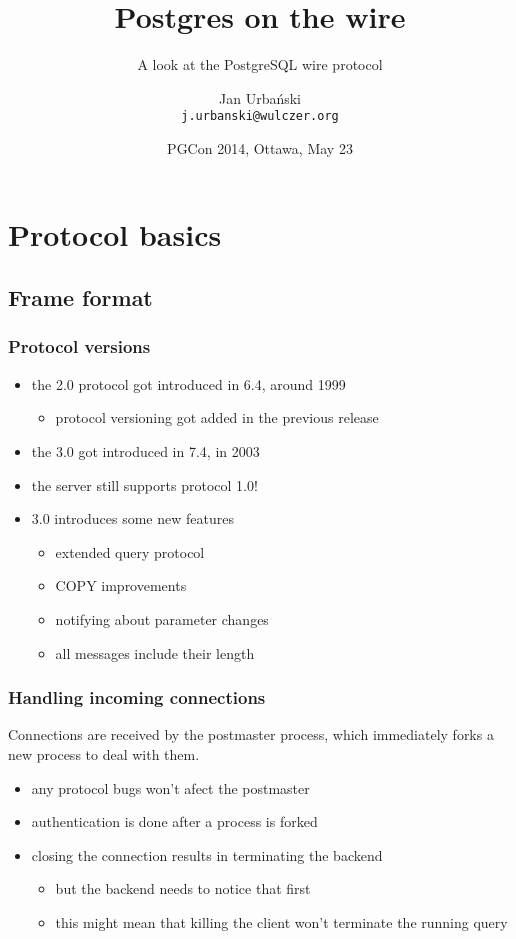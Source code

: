 \documentclass{beamer}
\title{Postgres on the wire}
\subtitle{A look at the PostgreSQL wire protocol}
\author[Jan Urbański]{Jan Urbański \\ \texttt{j.urbanski@wulczer.org}}
\institute{Ducksboard}
\date[PGCon 2014]{PGCon 2014, Ottawa, May 23}
\begin{document}
\frame{\titlepage}

\begin{frame}
  \tableofcontents
\end{frame}

\section{Protocol basics}
\subsection{Frame format}

\begin{frame}
  \frametitle{Protocol versions}

  \begin{itemize}
  \item the 2.0 protocol got introduced in 6.4, around 1999
    \begin{itemize}
    \item protocol versioning got added in the previous release
    \end{itemize}
  \item the 3.0 got introduced in 7.4, in 2003
  \item the server still supports protocol 1.0!
  \item 3.0 introduces some new features
    \begin{itemize}
    \item extended query protocol
    \item COPY improvements
    \item notifying about parameter changes
    \item all messages include their length
    \end{itemize}
  \end{itemize}
\end{frame}

\begin{frame}
  \frametitle{Handling incoming connections}

  Connections are received by the postmaster process, which immediately forks a
  new process to deal with them.

  \begin{itemize}
  \item any protocol bugs won't afect the postmaster
  \item authentication is done after a process is forked
  \item closing the connection results in terminating the backend
    \begin{itemize}
    \item but the backend needs to notice that first
    \item this might mean that killing the client won't terminate the running
      query
    \end{itemize}
  \end{itemize}
\end{frame}
\end{document}
